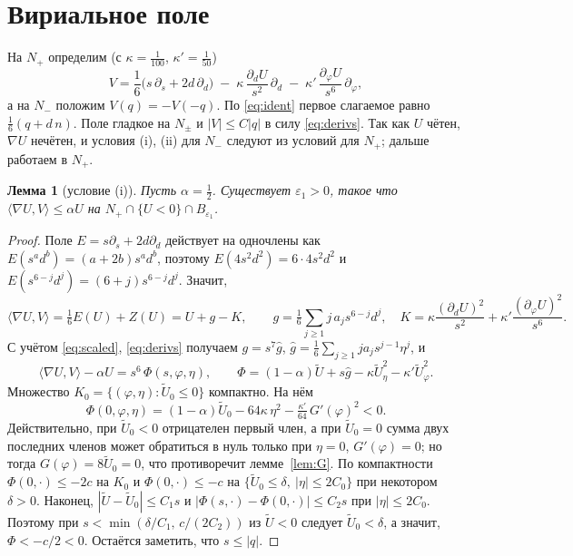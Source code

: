 \documentclass[11pt,a4paper]{article}
\newtheorem{lemma}{Лемма}
\theoremstyle{definition}
\newcommand{\eps}{\varepsilon}
\newcommand{\tU}{\widetilde U}
\begin{document}
\section{Вириальное поле}
На $N_+$ определим (с $\kappa=\frac1{100}$, $\kappa'=\frac1{50}$)
\[
V=\frac16\bigl(s\,\partial_s+2d\,\partial_d\bigr)\;-\;\kappa\,\frac{\partial_dU}{s^2}\,\partial_d\;-\;\kappa'\,\frac{\partial_\varphi U}{s^6}\,\partial_\varphi ,
\]
а на $N_-$ положим $V(q)=-V(-q)$. По \eqref{eq:ident} первое слагаемое равно $\frac16(q+d\,n)$.
Поле гладкое на $N_\pm$ и $|V|\le C|q|$ в силу \eqref{eq:derivs}. Так как $U$ чётен, $\nabla U$ нечётен, и
условия (i), (ii) для $N_-$ следуют из условий для $N_+$; дальше работаем в $N_+$.

\begin{lemma}[условие (i)]\label{lem:i}
Пусть $\alpha=\frac12$. Существует $\eps_1>0$, такое что $\langle\nabla U,V\rangle\le\alpha U$ на $N_+\cap\{U<0\}\cap B_{\eps_1}$.
\end{lemma}
\begin{proof}
Поле $E=s\partial_s+2d\partial_d$ действует на одночлены как $E(s^ad^b)=(a+2b)s^ad^b$, поэтому
$E(4s^2d^2)=6\cdot4s^2d^2$ и $E(s^{6-j}d^j)=(6+j)s^{6-j}d^j$. Значит,
\[
\langle\nabla U,V\rangle=\tfrac16E(U)+Z(U)=U+g-K,\qquad
g=\tfrac16\sum_{j\ge1}j\,a_js^{6-j}d^j,\quad
K=\kappa\frac{(\partial_dU)^2}{s^2}+\kappa'\frac{(\partial_\varphi U)^2}{s^6}.
\]
С учётом \eqref{eq:scaled}, \eqref{eq:derivs} получаем $g=s^7\hat g$, $\hat g=\frac16\sum_{j\ge1}ja_js^{j-1}\eta^j$, и
\[
\langle\nabla U,V\rangle-\alpha U=s^6\,\Phi(s,\varphi,\eta),\qquad
\Phi=(1-\alpha)\tU+s\hat g-\kappa\tU_\eta^2-\kappa'\tU_\varphi^2 .
\]
Множество $K_0=\{(\varphi,\eta):\tU_0\le0\}$ компактно. На нём
\[
\Phi(0,\varphi,\eta)=(1-\alpha)\tU_0-64\kappa\,\eta^2-\tfrac{\kappa'}{64}\,G'(\varphi)^2<0 .
\]
Действительно, при $\tU_0<0$ отрицателен первый член, а при $\tU_0=0$ сумма двух последних членов может
обратиться в нуль только при $\eta=0$, $G'(\varphi)=0$; но тогда $G(\varphi)=8\tU_0=0$, что противоречит лемме~\ref{lem:G}.
По компактности $\Phi(0,\cdot)\le-2c$ на $K_0$ и $\Phi(0,\cdot)\le-c$ на $\{\tU_0\le\delta,\ |\eta|\le2C_0\}$ при некотором
$\delta>0$. Наконец, $|\tU-\tU_0|\le C_1s$ и $|\Phi(s,\cdot)-\Phi(0,\cdot)|\le C_2s$ при $|\eta|\le2C_0$. Поэтому при
$s<\min(\delta/C_1,\,c/(2C_2))$ из $\tU<0$ следует $\tU_0<\delta$, а значит, $\Phi<-c/2<0$. Остаётся заметить, что
$s\le|q|$.
\end{proof}
\end{document}
